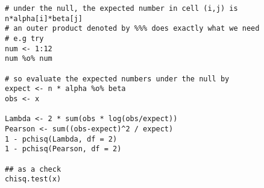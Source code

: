 \documentclass[answers]{exam}
\begin{document}
\begin{questions}
\begin{verbatim}
# under the null, the expected number in cell (i,j) is n*alpha[i]*beta[j]
# an outer product denoted by %%% does exactly what we need
# e.g try
num <- 1:12
num %o% num

# so evaluate the expected numbers under the null by
expect <- n * alpha %o% beta
obs <- x

Lambda <- 2 * sum(obs * log(obs/expect))
Pearson <- sum((obs-expect)^2 / expect)
1 - pchisq(Lambda, df = 2)
1 - pchisq(Pearson, df = 2)

## as a check
chisq.test(x)
\end{verbatim}

\end{questions}
\end{document}
